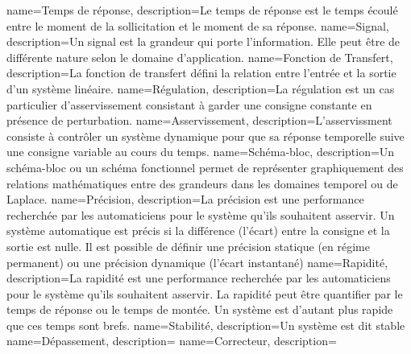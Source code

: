 %
{%
  name={Temps de réponse},%
  description={Le temps de réponse est le temps écoulé entre le moment de 
  la sollicitation et le moment de sa réponse.
  }
}
%
{%
  name={Signal},%
  description={Un signal est la grandeur qui porte l'information. Elle peut être
  de différente nature selon le domaine d'application.
  }
}
%
{%
  name={Fonction de Transfert},%
  description={La fonction de transfert défini la relation
  entre l'entrée et la sortie d'un système linéaire.
  }
}
%
{%
  name={Régulation},%
  description={La régulation est un cas particulier d'asservissement 
  consistant à garder une consigne constante en présence de perturbation.}
}
%
{%
  name={Asservissement},%
  description={L'asservissment consiste à contrôler un système dynamique
  pour que sa réponse temporelle suive une consigne variable au cours du 
  temps.
  }
}
%
{%
  name={Schéma-bloc},%
  description={Un schéma-bloc ou un schéma fonctionnel permet de 
  représenter graphiquement des relations mathématiques entre des grandeurs
  dans les domaines temporel ou de Laplace.
  }
}
%
{%
  name={Précision},%
  description={La précision est une performance recherchée par les automaticiens
  pour le système qu'ils souhaitent asservir. 
  Un système automatique est précis si la différence (l'écart) entre la 
  consigne et la sortie est nulle. Il est possible de définir une précision 
  statique (en régime permanent) ou une précision dynamique (l'écart instantané)
  }
}
%
{%
  name={Rapidité},%
  description={La rapidité est une performance recherchée par les automaticiens 
  pour le système qu'ils souhaitent asservir. 
  La rapidité peut être quantifier par le temps de réponse 
  ou le temps de montée. Un système est d'autant plus rapide que ces temps sont
  brefs.
  }
}
%
{%
  name={Stabilité},%
  description={Un système est dit stable  
  }
}
%
{%
  name={Dépassement},%
  description={  
  }
}
%
{%
  name={Correcteur},%
  description={
  }
}
